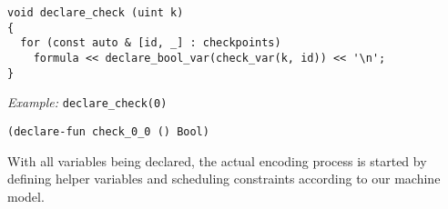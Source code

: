 

\begin{lstlisting}[style=c++]
void declare_check (uint k)
{
  for (const auto & [id, _] : checkpoints)
    formula << declare_bool_var(check_var(k, id)) << '\n';
}
\end{lstlisting}

\noindent
\emph{Example:} \lstinline[style=c++]{declare_check(0)}

\begin{lstlisting}[language=SMTLib]
(declare-fun check_0_0 () Bool)
\end{lstlisting}

%
%


\noindent
With all variables being declared, the actual encoding process is started by defining helper variables and scheduling constraints according to our machine model.

